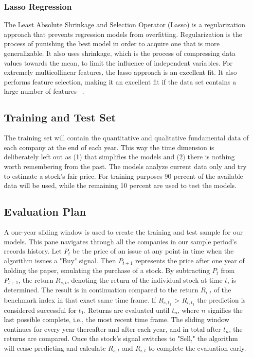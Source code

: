 \documentclass{imc-inf}
\begin{document}
\subsubsection{Lasso Regression}
The Least Absolute Shrinkage and Selection Operator (Lasso) is a regularization approach that prevents regression models from overfitting. Regularization is the process of punishing the best model in order to acquire one that is more generalizable. It also uses shrinkage, which is the process of compressing data values towards the mean, to limit the influence of independent variables. For extremely multicollinear features, the lasso approach is an excellent fit. It also performs feature selection, making it an excellent fit if the data set contains a large number of features ~\cite{lasso_intro}.

\subsection{Training and Test Set}
The training set will contain the quantitative and qualitative fundamental data of each company at the end of each year. This way the time dimension is deliberately left out as (1) that simplifies the models and (2) there is nothing worth remembering from the past. The models analyze current data only and try to estimate a stock’s fair price.  For training purposes 90 percent of the available data will be used, while the remaining 10 percent are used to test the models. 

\subsection{Evaluation Plan}%
A one-year sliding window is used to create the training and test sample for our models. This pane navigates through all the companies in our sample period's records history. Let $P_{t}$ be the price of an issue at any point in time when the algorithm issues a "Buy" signal. Then $P_{t+1}$ represents the price after one year of holding the paper, emulating the purchase of a stock. By subtracting $P_{t}$ from $P_{t+1}$, the return $R_{s,t}$, denoting the return of the individual stock at time $t$, is determined. The result is in continuation compared to the return $R_{i,t}$ of the benchmark index in that exact same time frame. If $R_{s,t_{1}}$ > $R_{i,t_{1}}$ the prediction is considered successful for $t_{1}$. Returns are evaluated until $t_{n}$, where $n$ signifies the last possible complete, i.e., the most recent time frame. The sliding window continues for every year thereafter and after each year, and in total after $t_{n}$, the returns are compared. Once the stock's signal switches to "Sell," the algorithm will cease predicting and calculate $R_{s,t}$ and $R_{i,t}$ to complete the evaluation early.
\end{document}
